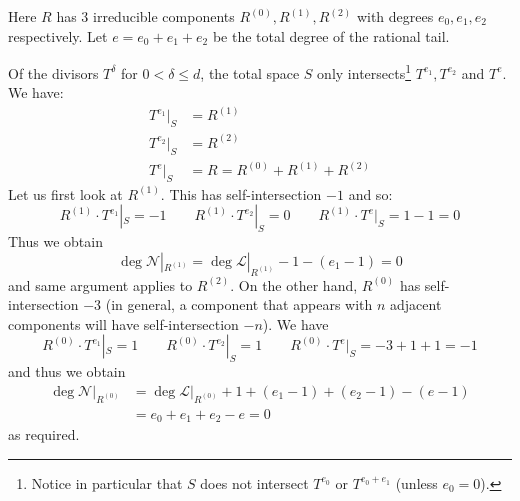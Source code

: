 \begin{center}

\end{center}

Here $R$ has $3$ irreducible components $R^{(0)},R^{(1)},R^{(2)}$ with degrees $e_0,e_1,e_2$ respectively. Let $e = e_0+e_1+e_2$ be the total degree of the rational tail.

Of the divisors $T^{\delta}$ for $0<\delta\leq d$, the total space $S$ only intersects\footnote{Notice in particular that $S$ does not intersect $T^{e_0}$ or $T^{e_0+e_1}$ (unless $e_0=0$).} $T^{e_1}, T^{e_2}$ and $T^e$. We have:
\begin{align*}
T^{e_1}|_S & = R^{(1)} \\
T^{e_2}|_S & = R^{(2)} \\
T^e|_S & = R = R^{(0)} + R^{(1)} + R^{(2)}
\end{align*}
Let us first look at $R^{(1)}$. This has self-intersection $-1$ and so:
\begin{equation*} R^{(1)} \cdot T^{e_1}|_S = -1 \qquad R^{(1)} \cdot T^{e_2}|_S = 0 \qquad R^{(1)} \cdot T^e|_S = 1-1 = 0 \end{equation*}
Thus we obtain
\begin{equation*} \deg \mathcal{N}|_{R^{(1)}} = \deg \mathcal{L}|_{R^{(1)}} - 1 - (e_1 - 1) = 0 \end{equation*}
and same argument applies to $R^{(2)}$. On the other hand, $R^{(0)}$ has self-intersection $-3$ (in general, a component that appears with $n$ adjacent components will have self-intersection $-n$). We have
\begin{equation*} R^{(0)} \cdot T^{e_1}|_S = 1 \qquad R^{(0)} \cdot T^{e_2}|_S = 1 \qquad R^{(0)} \cdot T^e|_S = -3 + 1 + 1 = -1 \end{equation*}
and thus we obtain
\begin{align*} \deg \mathcal{N}|_{R^{(0)}} & = \deg \mathcal{L}|_{R^{(0)}} + 1 + (e_1 - 1) + (e_2 - 1) - (e-1) \\
& = e_0 + e_1 + e_2 - e = 0 \end{align*}
as required.

